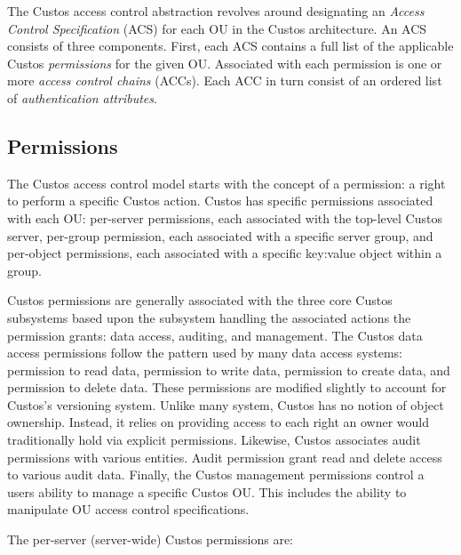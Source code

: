 The Custos access control abstraction revolves around designating an
\emph{Access Control Specification} (ACS) for each OU in the Custos
architecture. An ACS consists of three components. First, each ACS
contains a full list of the applicable Custos \emph{permissions} for
the given OU. Associated with each permission is one or more
\emph{access control chains} (ACCs). Each ACC in turn consist of an
ordered list of \emph{authentication attributes}.

\subsection{Permissions}

The Custos access control model starts with the concept of a
permission: a right to perform a specific Custos action. Custos has
specific permissions associated with each OU: per-server permissions,
each associated with the top-level Custos server, per-group
permission, each associated with a specific server group, and
per-object permissions, each associated with a specific key:value
object within a group.

Custos permissions are generally associated with the three core Custos
subsystems based upon the subsystem handling the associated actions
the permission grants: data access, auditing, and management. The
Custos data access permissions follow the pattern used by many data
access systems: permission to read data, permission to write data,
permission to create data, and permission to delete data. These
permissions are modified slightly to account for Custos's versioning
system. Unlike many system, Custos has no notion of object
ownership. Instead, it relies on providing access to each right an
owner would traditionally hold via explicit permissions. Likewise,
Custos associates audit permissions with various entities. Audit
permission grant read and delete access to various audit data.
Finally, the Custos management permissions control a users ability to
manage a specific Custos OU. This includes the ability to manipulate
OU access control specifications.

\noindent
The per-server (server-wide) Custos permissions are:

